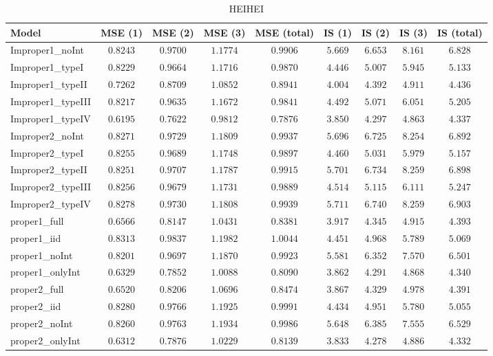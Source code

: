 \begin{table}

\caption{\label{tab:model-choice-sc2}HEIHEI}
\centering
\begin{tabular}{lcccccccc}
\hline
Model  & MSE (1) & MSE (2) & MSE (3) & MSE (total) & IS (1) & IS (2) & IS (3) & \multicolumn{1}{c}{IS (total)} \\ 
\hline
Improper1_noInt  & $0.8243$ & $0.9700$ & $1.1774$ & $0.9906$ & $5.669$ & $6.653$ & $8.161$ & $6.828$ \\
Improper1_typeI  & $0.8229$ & $0.9664$ & $1.1716$ & $0.9870$ & $4.446$ & $5.007$ & $5.945$ & $5.133$ \\
Improper1_typeII  & $0.7262$ & $0.8709$ & $1.0852$ & $0.8941$ & $4.004$ & $4.392$ & $4.911$ & $4.436$ \\
Improper1_typeIII  & $0.8217$ & $0.9635$ & $1.1672$ & $0.9841$ & $4.492$ & $5.071$ & $6.051$ & $5.205$ \\
Improper1_typeIV  & $0.6195$ & $0.7622$ & $0.9812$ & $0.7876$ & $3.850$ & $4.297$ & $4.863$ & $4.337$ \\
Improper2_noInt  & $0.8271$ & $0.9729$ & $1.1809$ & $0.9937$ & $5.696$ & $6.725$ & $8.254$ & $6.892$ \\
Improper2_typeI  & $0.8255$ & $0.9689$ & $1.1748$ & $0.9897$ & $4.460$ & $5.031$ & $5.979$ & $5.157$ \\
Improper2_typeII  & $0.8251$ & $0.9707$ & $1.1787$ & $0.9915$ & $5.701$ & $6.734$ & $8.259$ & $6.898$ \\
Improper2_typeIII  & $0.8256$ & $0.9679$ & $1.1731$ & $0.9889$ & $4.514$ & $5.115$ & $6.111$ & $5.247$ \\
Improper2_typeIV  & $0.8278$ & $0.9730$ & $1.1808$ & $0.9939$ & $5.711$ & $6.740$ & $8.259$ & $6.903$ \\
proper1_full  & $0.6566$ & $0.8147$ & $1.0431$ & $0.8381$ & $3.917$ & $4.345$ & $4.915$ & $4.393$ \\
proper1_iid  & $0.8313$ & $0.9837$ & $1.1982$ & $1.0044$ & $4.451$ & $4.968$ & $5.789$ & $5.069$ \\
proper1_noInt  & $0.8201$ & $0.9697$ & $1.1870$ & $0.9923$ & $5.581$ & $6.352$ & $7.570$ & $6.501$ \\
proper1_onlyInt  & $0.6329$ & $0.7852$ & $1.0088$ & $0.8090$ & $3.862$ & $4.291$ & $4.868$ & $4.340$ \\
proper2_full  & $0.6520$ & $0.8206$ & $1.0696$ & $0.8474$ & $3.867$ & $4.329$ & $4.978$ & $4.391$ \\
proper2_iid  & $0.8280$ & $0.9766$ & $1.1925$ & $0.9991$ & $4.434$ & $4.951$ & $5.780$ & $5.055$ \\
proper2_noInt  & $0.8260$ & $0.9763$ & $1.1934$ & $0.9986$ & $5.648$ & $6.385$ & $7.555$ & $6.529$ \\
proper2_onlyInt  & $0.6312$ & $0.7876$ & $1.0229$ & $0.8139$ & $3.833$ & $4.278$ & $4.886$ & $4.332$ \\
\hline 
\end{tabular}


\end{table}